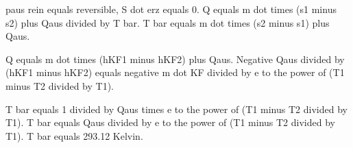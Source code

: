 paus rein equals reversible, S dot erz equals 0.  
Q equals m dot times (s1 minus s2) plus Qaus divided by T bar.  
T bar equals m dot times (s2 minus s1) plus Qaus.  

Q equals m dot times (hKF1 minus hKF2) plus Qaus.  
Negative Qaus divided by (hKF1 minus hKF2) equals negative m dot KF divided by e to the power of (T1 minus T2 divided by T1).  

T bar equals 1 divided by Qaus times e to the power of (T1 minus T2 divided by T1).  
T bar equals Qaus divided by e to the power of (T1 minus T2 divided by T1).  
T bar equals 293.12 Kelvin.